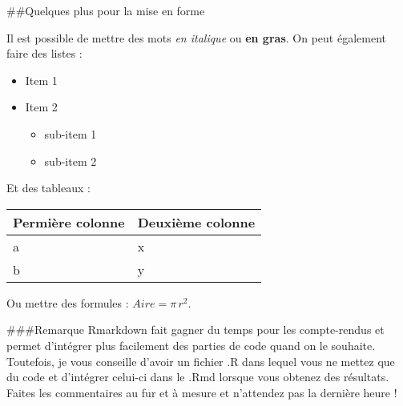 \documentclass[]{article}
\begin{document}
\#\#Quelques plus pour la mise en forme

Il est possible de mettre des mots \emph{en italique} ou \textbf{en
gras}. On peut également faire des listes :

\begin{itemize}
\item
  Item 1
\item
  Item 2

  \begin{itemize}
  \item
    sub-item 1
  \item
    sub-item 2
  \end{itemize}
\end{itemize}

Et des tableaux :

\begin{longtable}[]{@{}ll@{}}
\toprule
Permière colonne & Deuxième colonne\tabularnewline
\midrule
\endhead
a & x\tabularnewline
b & y\tabularnewline
\bottomrule
\end{longtable}

Ou mettre des formules : \(Aire = \pi\,r^{2}\).

\#\#\#Remarque Rmarkdown fait gagner du temps pour les compte-rendus et
permet d'intégrer plus facilement des parties de code quand on le
souhaite. Toutefois, je vous conseille d'avoir un fichier .R dans lequel
vous ne mettez que du code et d'intégrer celui-ci dans le .Rmd lorsque
vous obtenez des résultats. Faites les commentaires au fur et à mesure
et n'attendez pas la dernière heure !
\end{document}

